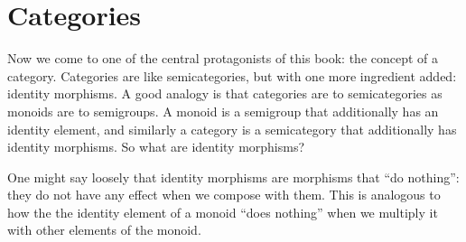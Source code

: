 


%
%

\section{Categories}

Now we come to one of the central protagonists of this book: the concept of a category.
Categories are like semicategories, but with one more ingredient added: identity morphisms.
A good analogy is that categories are to semicategories as monoids are to semigroups.
A monoid is a semigroup that additionally has an identity element, and similarly a category is a semicategory that additionally has identity morphisms.
So what are identity morphisms?

One might say loosely that identity morphisms are morphisms that ``do nothing'': they do not have any effect when we compose with them.
This is analogous to how the the identity element of a monoid ``does nothing'' when we multiply it with other elements of the monoid.

